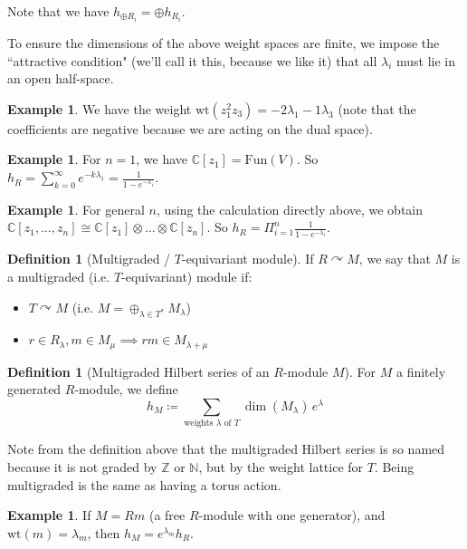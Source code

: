 \documentclass[12pt]{amsart}
\numberwithin{equation}{section}
\theoremstyle{definition}
\newtheorem{Example}[equation]{Example}
\newtheorem{Definition}[equation]{Definition}
\numberwithin{figure}{section}
\newcommand{\C}{\mathbb{C}}
\begin{document}
Note that we have $h_{\oplus R_i} = \oplus h_{R_i}$.

To ensure the dimensions of the above weight spaces are finite, we impose the ``attractive condition" (we'll call it this, because we like it) that all $\lambda_i$ must lie in an open half-space.

\begin{Example}
We have the weight $\text{wt}(z_1^2 z_3) = -2 \lambda_1 - 1 \lambda_3$ (note that the coefficients are negative because we are acting on the dual space).
\end{Example}

\begin{Example}
For $n=1$, we have $\C[z_1] = \text{Fun}(V)$. So $h_R = \sum_{k=0}^{\infty} e^{-k \lambda_1} = \frac{1}{1-e^{-\lambda_1}}$.
\end{Example}

\begin{Example}
For general $n$, using the calculation directly above, we obtain $\C[z_1, \dots, z_n] \cong \C[z_1] \otimes \dots \otimes \C[z_n]$. So $h_R = \Pi_{i=1}^{n}  \frac{1}{1-e^{-\lambda_i}}$.
\end{Example}

\begin{Definition}[Multigraded / $T$-equivariant module]
If $R \curvearrowright M$, we say that $M$ is a multigraded (i.e. $T$-equivariant) module if:
\begin{itemize}
    \item $T \curvearrowright M$ (i.e. $M = \oplus_{\lambda \in T^{\ast}} M_{\lambda}$)
    \item $r \in R_{\lambda}, m \in M_{\mu} \implies rm \in M_{\lambda + \mu}$
\end{itemize} \end{Definition}

\begin{Definition}[Multigraded Hilbert series of an $R$-module $M$]
For $M$ a finitely generated $R$-module, we define 
$$ h_M \coloneqq \sum_{\text{weights } \lambda \text{ of } T} \dim(M_{\lambda}) \, e^{\lambda} $$
\end{Definition} 

Note from the definition above that the multigraded Hilbert series is so named because it is not graded by $\mathbb{Z}$ or $\mathbb{N}$, but by the weight lattice for $T$. Being multigraded is the same as having a torus action.

\begin{Example}
If $M = Rm$ (a free $R$-module with one generator), and $\text{wt}(m) = \lambda_m$, then $h_M = e^{\lambda_m} h_R$.
\end{Example}
\end{document}
